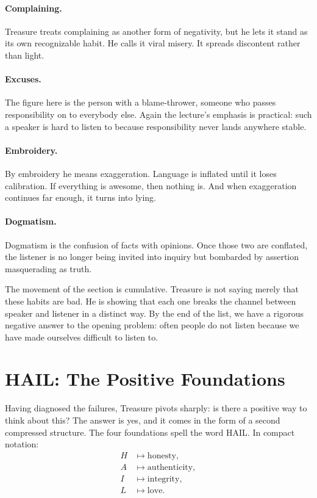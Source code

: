 \paragraph{Complaining.} Treasure treats complaining as another form of negativity, but he lets it stand as its own recognizable habit. He calls it viral misery. It spreads discontent rather than light.

\paragraph{Excuses.} The figure here is the person with a blame-thrower, someone who passes responsibility on to everybody else. Again the lecture's emphasis is practical: such a speaker is hard to listen to because responsibility never lands anywhere stable.

\paragraph{Embroidery.} By embroidery he means exaggeration. Language is inflated until it loses calibration. If everything is awesome, then nothing is. And when exaggeration continues far enough, it turns into lying.

\paragraph{Dogmatism.} Dogmatism is the confusion of facts with opinions. Once those two are conflated, the listener is no longer being invited into inquiry but bombarded by assertion masquerading as truth.

The movement of the section is cumulative. Treasure is not saying merely that these habits are bad. He is showing that each one breaks the channel between speaker and listener in a distinct way. By the end of the list, we have a rigorous negative answer to the opening problem: often people do not listen because we have made ourselves difficult to listen to.

\section{HAIL: The Positive Foundations}

Having diagnosed the failures, Treasure pivots sharply: is there a positive way to think about this? The answer is yes, and it comes in the form of a second compressed structure. The four foundations spell the word HAIL. In compact notation:
\begin{align}
H &\mapsto \text{honesty},\\
A &\mapsto \text{authenticity},\\
I &\mapsto \text{integrity},\\
L &\mapsto \text{love}.
\end{align}

